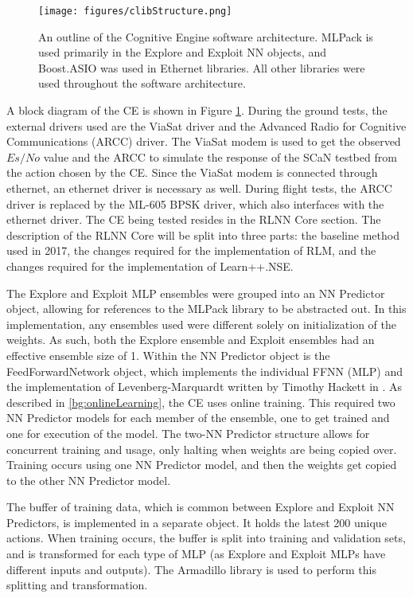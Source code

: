 \begin{figure}
\caption{An outline of the Cognitive Engine software architecture. MLPack is used primarily in the Explore and Exploit NN objects, and Boost.ASIO was used in Ethernet libraries. All other libraries were used throughout the software architecture.}
\texttt{[image: figures/clibStructure.png]}
\label{fig:timOutlineBlocks}
\end{figure}
\par A block diagram of the CE is shown in Figure \ref{fig:timOutlineBlocks}. During the ground tests, the external drivers used are the ViaSat driver and the Advanced Radio for Cognitive Communications (ARCC) driver. The ViaSat modem is used to get the observed $Es/No$ value and the ARCC to simulate the response of the SCaN testbed from the action chosen by the CE. Since the ViaSat modem is connected through ethernet, an ethernet driver is necessary as well. During flight tests, the ARCC driver is replaced by the ML-605 BPSK driver, which also interfaces with the ethernet driver. The CE being tested resides in the RLNN Core section. The description of the RLNN Core will be split into three parts: the baseline method used in 2017, the changes required for the implementation of RLM, and the changes required for the implementation of Learn++.NSE.
\par The Explore and Exploit MLP ensembles were grouped into an NN Predictor object, allowing for references to the MLPack library to be abstracted out. In this implementation, any ensembles used were different solely on initialization of the weights. As such, both the Explore ensemble and Exploit ensembles had an effective ensemble size of 1. Within the NN Predictor object is the FeedForwardNetwork object, which implements the individual FFNN (MLP) and the implementation of Levenberg-Marquardt written by Timothy Hackett in \cite{tim_implementation_paper}. As described in \ref{bg:onlineLearning}, the CE uses online training. This required two NN Predictor models for each member of the ensemble, one to get trained and one for execution of the model. The two-NN Predictor structure allows for concurrent training and usage, only halting when weights are being copied over. Training occurs using one NN Predictor model, and then the weights get copied to the other NN Predictor model. 
\par The buffer of training data, which is common between Explore and Exploit NN Predictors, is implemented in a separate object. It holds the latest 200 unique actions. When training occurs, the buffer is split into training and validation sets, and is transformed for each type of MLP (as Explore and Exploit MLPs have different inputs and outputs). The Armadillo library is used to perform this splitting and transformation.
